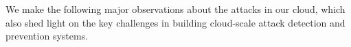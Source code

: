 








We make the following major observations about the attacks in our cloud,  
which also shed light on the key challenges in building cloud-scale attack detection and prevention systems. 

